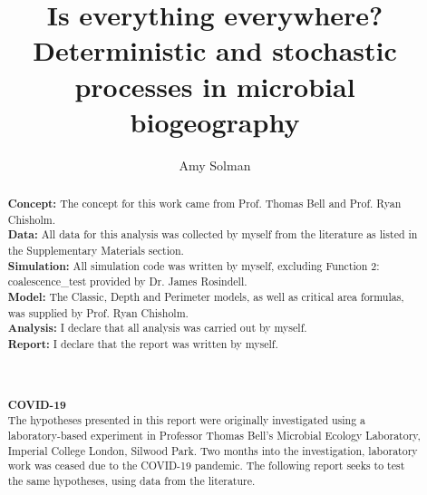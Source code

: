 \documentclass[11pt, a4paper, twoside]{report}
\title{Is everything everywhere? Deterministic and stochastic processes in microbial biogeography}
\author{Amy Solman}
\begin{document}


\renewcommand{\abstractname}{Declaration}
\begin{abstract}
\textbf{Concept:} The concept for this work came from Prof. Thomas Bell and Prof. Ryan Chisholm.\\
\noindent \textbf{Data:} All data for this analysis was collected by myself from the literature as listed in the Supplementary Materials section.\\
\noindent \textbf{Simulation:} All simulation code was written by myself, excluding Function 2: coalescence\_test provided by Dr. James Rosindell.\\
\noindent \textbf{Model:} The Classic, Depth and Perimeter models, as well as critical area formulas, was supplied by Prof. Ryan Chisholm.\\
\noindent \textbf{Analysis:} I declare that all analysis was carried out by myself.\\
\noindent \textbf{Report:} I declare that the report was written by myself.\\
\\ \\ \\

\noindent \textbf{COVID-19} \\
\noindent The hypotheses presented in this report were originally investigated using a laboratory-based experiment in Professor Thomas Bell's Microbial Ecology Laboratory, Imperial College London, Silwood Park. Two months into the investigation, laboratory work was ceased due to the COVID-19 pandemic. The following report seeks to test the same hypotheses, using data from the literature.
\end{abstract}
\end{document}
